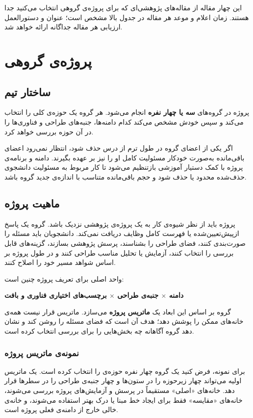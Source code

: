 \documentclass[12pt]{article}
\begin{document}
این چهار مقاله از مقاله‌های پژوهشی‌ای که برای پروژه‌ی گروهی انتخاب می‌کنید جدا هستند. زمان اعلام و موعد هر مقاله در جدول بالا مشخص است؛ عنوان و دستورالعمل ارزیابی هر مقاله جداگانه ارائه خواهد شد.

\section{پروژه‌ی گروهی}
\subsection{ساختار تیم}
پروژه در گروه‌های \textbf{سه یا چهار نفره} انجام می‌شود. هر گروه یک حوزه‌ی کلی را انتخاب می‌کند و سپس خودش مشخص می‌کند کدام دامنه‌ها، جنبه‌های طراحی و فناوری‌ها را در آن حوزه بررسی خواهد کرد.

اگر یکی از اعضای گروه در طول ترم از درس حذف شود، انتظار نمی‌رود اعضای باقی‌مانده به‌صورت خودکار مسئولیت کامل او را نیز بر عهده بگیرند. دامنه و برنامه‌ی پروژه با کمک دستیار آموزشی بازتنظیم می‌شود تا کار مربوط به مسئولیت دانشجوی حذف‌شده محدود یا حذف شود و حجم باقی‌مانده متناسب با اندازه‌ی جدید گروه باشد.

\subsection{ماهیت پروژه}
پروژه باید از نظر شیوه‌ی کار به یک پروژه‌ی پژوهشی نزدیک باشد. گروه یک پاسخ ازپیش‌تعیین‌شده یا فهرست کامل وظایف دریافت نمی‌کند. دانشجویان باید مسئله را صورت‌بندی کنند، فضای طراحی را بشناسند، پرسش پژوهشی بسازند، گزینه‌های قابل بررسی را انتخاب کنند، آزمایش یا تحلیل مناسب طراحی کنند و در طول پروژه بر اساس شواهد مسیر خود را اصلاح کنند.

واحد اصلی برای تعریف پروژه چنین است:
\begin{center}
\textbf{دامنه $\times$ جنبه‌ی طراحی $\times$ برچسب‌های اختیاری فناوری و بافت}
\end{center}

گروه بر اساس این ابعاد یک \textbf{ماتریس پروژه} می‌سازد. ماتریس قرار نیست همه‌ی خانه‌های ممکن را پوشش دهد؛ هدف آن است که فضای مسئله را روشن کند و نشان دهد گروه آگاهانه چه بخش‌هایی را برای بررسی انتخاب کرده است.

\subsubsection*{نمونه‌ی ماتریس پروژه}
برای نمونه، فرض کنید یک گروه چهار نفره حوزه‌ی  را انتخاب کرده است. یک ماتریس اولیه می‌تواند چهار زیرحوزه را در ستون‌ها و چهار جنبه‌ی طراحی را در سطرها قرار دهد. خانه‌های «اصلی» مستقیماً در پرسش و آزمایش‌های پروژه بررسی می‌شوند، خانه‌های «مقایسه» فقط برای ایجاد خط مبنا یا درک بهتر استفاده می‌شوند، و خانه‌ی خالی خارج از دامنه‌ی فعلی پروژه است.
\end{document}
